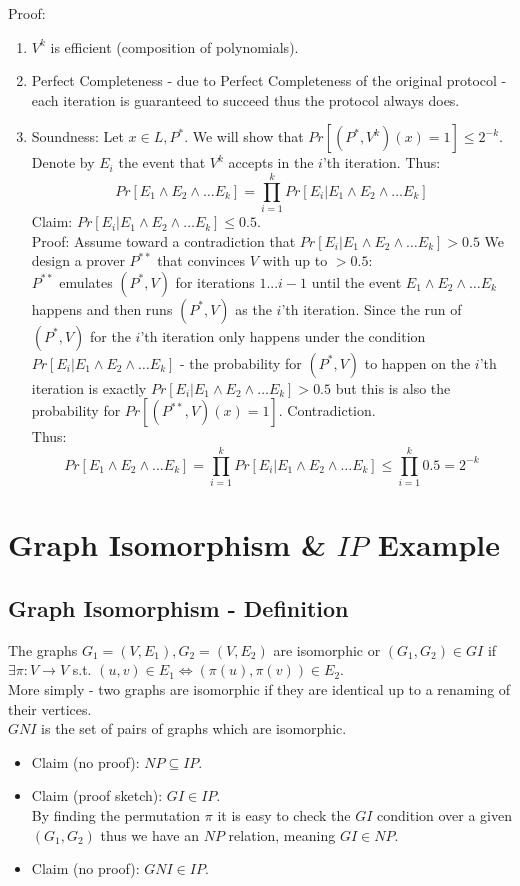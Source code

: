 Proof:
\begin{enumerate}
    \item $V^k$ is efficient  (composition of polynomials).
    \item Perfect Completeness - due to Perfect  Completeness of the original protocol - each iteration is guaranteed to succeed thus the protocol always does.
    \item Soundness: Let $x\in L, P^*$. We will show that $Pr[(P^*, V^k)(x)=1]\leq 2^{-k}$.
    Denote by $E_i$ the event that $V^k$ accepts in the $i$'th iteration. Thus:
    \[
        Pr[E_1\wedge E_2\wedge\dots E_k]=\prod_{i=1}^kPr[E_i|E_1\wedge E_2\wedge\dots E_k]
    \]
    Claim: $Pr[E_i|E_1\wedge E_2\wedge\dots E_k]\leq 0.5$.\\
    Proof: Assume toward a contradiction that $Pr[E_i|E_1\wedge E_2\wedge\dots E_k]>0.5$
    We design a prover $P^{**}$ that convinces $V$ with up to $>0.5$:\\
    $P^{**}$ emulates $(P^*, V)$ for iterations $1...i-1$ until the event $E_1\wedge E_2\wedge\dots E_k$ happens and then runs $(P^*,V)$ as the $i$'th iteration. Since the run of $(P^*,V)$ for the $i$'th iteration only happens under the condition $Pr[E_i|E_1\wedge E_2\wedge\dots E_k]$ - the probability for $(P^*,V)$ to happen on the $i$'th iteration is exactly $Pr[E_i|E_1\wedge E_2\wedge\dots E_k]>0.5$ but this is also the probability for $Pr[(P^{**},V)(x)=1]$. Contradiction.\\
    
    Thus:
    \[
        Pr[E_1\wedge E_2\wedge\dots E_k]=\prod_{i=1}^kPr[E_i|E_1\wedge E_2\wedge\dots E_k]\leq \prod_{i=1}^k0.5=2^{-k}
    \]
\end{enumerate}

\section{Graph Isomorphism \& $IP$ Example}
\subsection{Graph Isomorphism - Definition}
The graphs $G_1=(V,E_1), G_2=(V,E_2)$ are isomorphic or $(G_1,G_2)\in GI$ if $\exists\pi:V\longrightarrow V$ s.t. $(u,v)\in E_1 \iff (\pi(u), \pi(v))\in E_2$.\\
More simply - two graphs are isomorphic if they are identical up to a renaming of their vertices.\\

$GNI$ is the set of pairs of graphs which are isomorphic.\\
\begin{itemize}
    \item Claim (no proof): $NP\subseteq IP$.\\
    \item Claim (proof sketch): $GI\in IP$.\\
    By finding the permutation $\pi$ it is easy to check the $GI$ condition over a given $(G_1,G_2)$ thus we have an $NP$ relation, meaning $GI\in NP$.\\
    \item Claim (no proof): $GNI\in IP$.
\end{itemize}